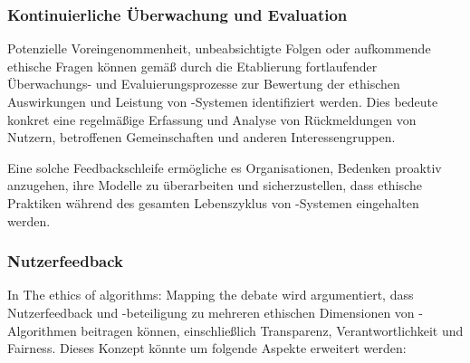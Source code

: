 \documentclass[hidelinks,12pt]{report}
\begin{document}
\subsubsection{Kontinuierliche Überwachung und Evaluation}
Potenzielle Voreingenommenheit, unbeabsichtigte Folgen oder aufkommende ethische Fragen können gemäß \cite{EUCommision} durch die Etablierung fortlaufender Überwachungs- und Evaluierungsprozesse zur Bewertung der ethischen Auswirkungen und Leistung von -Systemen identifiziert werden. Dies bedeute konkret eine regelmäßige Erfassung und Analyse von Rückmeldungen von Nutzern, betroffenen Gemeinschaften und anderen Interessengruppen. 

Eine solche Feedbackschleife ermögliche es Organisationen, Bedenken proaktiv anzugehen, ihre Modelle zu überarbeiten und sicherzustellen, dass ethische Praktiken während des gesamten Lebenszyklus von -Systemen eingehalten werden.

\subsubsection{Nutzerfeedback}
In The ethics of algorithms: Mapping the debate \cite{Mittelstadt} wird argumentiert, dass Nutzerfeedback und -beteiligung zu mehreren ethischen Dimensionen von -Algorithmen beitragen können, einschließlich Transparenz, Verantwortlichkeit und Fairness. Dieses Konzept könnte um folgende Aspekte erweitert werden:
\end{document}
